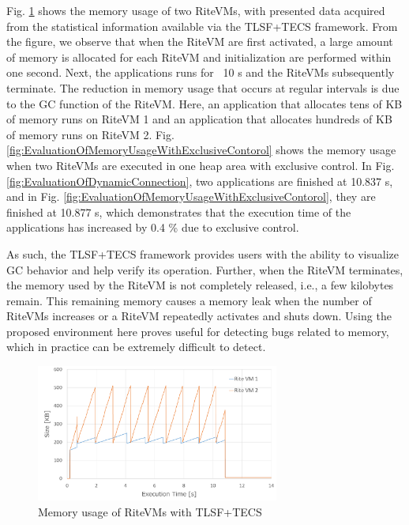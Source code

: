 \documentclass[JIP]{ipsj_v2/UTF8/ipsj}
\begin{document}
Fig. \ref{fig:EvaluationOfTLSFStatistics} shows the memory usage of two RiteVMs, with presented data acquired from the statistical information available via the TLSF+TECS framework.
From the figure, we observe that when the RiteVM are first activated, a large amount of memory is allocated for each RiteVM and initialization are performed within one second.
Next, the applications runs for ~10 s and the RiteVMs subsequently terminate.
The reduction in memory usage that occurs at regular intervals is due to the GC function of the RiteVM.
Here, an application that allocates tens of KB of memory runs on RiteVM 1 and an application that allocates hundreds of KB of memory runs on RiteVM 2.
Fig. \ref{fig:EvaluationOfMemoryUsageWithExclusiveContorol} shows the memory usage when two RiteVMs are executed in one heap area with exclusive control.
In Fig. \ref{fig:EvaluationOfDynamicConnection}, two applications are finished at 10.837 s, and in Fig. \ref{fig:EvaluationOfMemoryUsageWithExclusiveContorol}, they are finished at 10.877 s, which demonstrates that the execution time of the applications has increased by 0.4 \% due to exclusive control.

As such, the TLSF+TECS framework provides users with the ability to visualize GC behavior and help verify its operation.
Further, when the RiteVM terminates, the memory used by the RiteVM is not completely released, i.e., a few kilobytes remain.
This remaining memory causes a memory leak when the number of RiteVMs increases or a RiteVM repeatedly activates and shuts down.
Using the proposed environment here proves useful for detecting bugs related to memory, which in practice can be extremely difficult to detect.

\begin{figure}[t]
    \centering
    \includegraphics[width=8cm,clip]{figure/EvaluationOfTLSFStatistics.pdf}
    \caption{Memory usage of RiteVMs with TLSF+TECS}
    \label{fig:EvaluationOfTLSFStatistics}
\end{figure}
\end{document}
